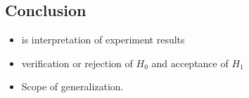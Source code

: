 \subsection{Conclusion}

\begin{itemize}
	\item is interpretation of experiment results
	\item verification or rejection of $H_0$ and acceptance of $H_1$
	\item Scope of generalization.
\end{itemize}